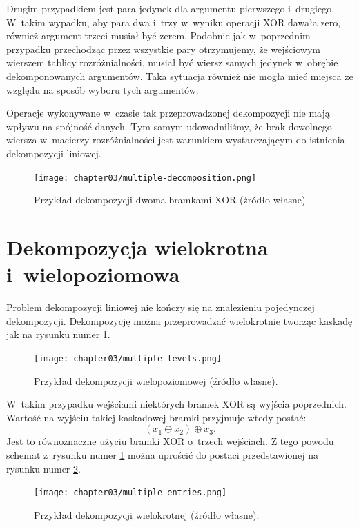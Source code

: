Drugim przypadkiem jest para jedynek dla argumentu pierwszego i~drugiego.
W~takim wypadku,
aby para dwa i~trzy w~wyniku operacji XOR dawała zero,
również argument trzeci musiał być zerem.
Podobnie jak w~poprzednim przypadku przechodząc przez wszystkie pary otrzymujemy,
że wejściowym wierszem tablicy rozróżnialności,
musiał być wiersz samych jedynek w~obrębie dekomponowanych argumentów.
Taka sytuacja również nie mogła mieć miejsca ze względu na sposób wyboru tych argumentów.

Operacje wykonywane w~czasie tak przeprowadzonej dekompozycji nie mają wpływu na spójność danych.
Tym samym udowodniliśmy,
że brak dowolnego wiersza w~macierzy rozróżnialności jest warunkiem wystarczającym do istnienia dekompozycji liniowej.

\begin{figure}[H]
\centering
\texttt{[image: chapter03/multiple-decomposition.png]}
\caption{Przykład dekompozycji dwoma bramkami XOR (źródło własne).}
\end{figure}

\section{Dekompozycja wielokrotna i~wielopoziomowa}

Problem dekompozycji liniowej nie kończy się na znalezieniu pojedynczej dekompozycji.
Dekompozycję można przeprowadzać wielokrotnie tworząc kaskadę jak na rysunku numer \ref{fig:multiple-levels}.

\begin{figure}[H]
\centering
\texttt{[image: chapter03/multiple-levels.png]}
\caption{Przykład dekompozycji wielopoziomowej (źródło własne).}
\label{fig:multiple-levels}
\end{figure}

W~takim przypadku wejściami niektórych bramek XOR są wyjścia poprzednich.
Wartość na wyjściu takiej kaskadowej bramki przyjmuje wtedy postać:
\begin{equation}
(x_1 \oplus x_2) \oplus x_3.
\end{equation}
Jest to równoznaczne użyciu bramki XOR o~trzech wejściach.
Z tego powodu schemat z~rysunku numer \ref{fig:multiple-levels} można uprościć do postaci przedstawionej na rysunku numer \ref{fig:multiple-entries}.

\begin{figure}[H]
\centering
\texttt{[image: chapter03/multiple-entries.png]}
\caption{Przykład dekompozycji wielokrotnej (źródło własne).}
\label{fig:multiple-entries}
\end{figure}

